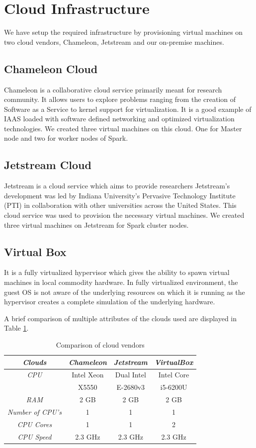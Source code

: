 \documentclass[9pt,twocolumn,twoside]{styles/osajnl}
\begin{document}
\section{Cloud Infrastructure}
We have setup the required infrastructure by provisioning virtual machines on two cloud vendors, Chameleon, Jetstream and our on-premise machines.
\subsection{Chameleon Cloud}
Chameleon  is a collaborative cloud service primarily meant for research community. It allows users to explore problems ranging from the creation of Software as a Service to kernel support for virtualization. It is a good example of IAAS loaded with software defined networking and optimized virtualization technologies. We created three virtual machines on this cloud. One for Master node and two for worker nodes of Spark.

\subsection{Jetstream Cloud}
Jetstream is a cloud service which aims to provide researchers Jetstream’s development was led by Indiana University’s Pervasive Technology Institute (PTI) in collaboration with other universities \cite{www-jetstream} across the United States. This cloud service was used to provision the necessary virtual machines. We created three virtual machines on Jetstream for Spark cluster nodes.

\subsection{Virtual Box}
It is a fully virtualized hypervisor which gives the ability to spawn virtual machines in local commodity hardware. In fully virtualized environment, the guest OS  is not aware of the underlying  resources on which it is running as the hypervisor creates a complete simulation of the underlying hardware. 

A brief comparison of multiple attributes of the clouds used are displayed in Table \ref{table:clouds}.

\begin{table}[h!]
\centering
\caption{Comparison of cloud vendors}
 \begin{tabular}{|c|c c c|} 
 \hline
 \textit{Clouds} & \textit{Chameleon} & \textit{Jetstream} & \textit{VirtualBox}  \\ 
 \hline
 \hline 
 \textit{CPU} & Intel Xeon & Dual Intel & Intel Core  \\ 
 & X5550 & E-2680v3 & i5-6200U\\
 \hline 
 \textit{RAM} & 2 GB & 2 GB & 2 GB \\ 
\hline 
\textit{Number of CPU's} & 1 & 1 & 1 \\
\hline 
\textit{CPU Cores} & 1 & 1 & 2\\
\hline 
\textit{CPU Speed} & 2.3 GHz & 2.3 GHz & 2.3 GHz\\
\hline 
\end{tabular}
\label{table:clouds}
\end{table}
\end{document}

